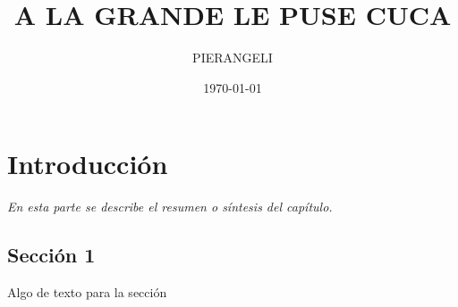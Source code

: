 \documentclass[]{book}
\title{\bf A LA GRANDE LE PUSE CUCA}
\author{PIERANGELI}
\date{\today}
\begin{document}
\frontmatter
\maketitle
\tableofcontents
\mainmatter
\chapter{Introducción}
\begin{center}
\textit{En esta parte se describe el resumen o síntesis
del capítulo.}
\end{center}
\section{Sección 1}
Algo de texto para la sección
\end{document}
